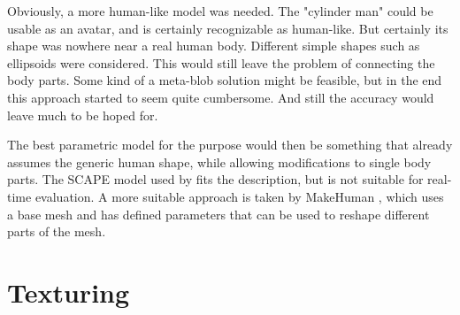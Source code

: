 Obviously, a more human-like model was needed. The "cylinder man" could be usable as an avatar, and is certainly recognizable as human-like. But certainly its shape was nowhere near a real human body. Different simple shapes such as ellipsoids were considered. This would still leave the problem of connecting the body parts. Some kind of a meta-blob solution might be feasible, but in the end this approach started to seem quite cumbersome. And still the accuracy would leave much to be hoped for.

The best parametric model for the purpose would then be something that already assumes the generic human shape, while allowing  modifications to single body parts. The SCAPE model \citep{} used by \citet{} fits the description, but is not suitable for real-time evaluation. A more suitable approach is taken by MakeHuman \citep{}, which uses a base mesh and has defined parameters that can be used to reshape different parts of the mesh.

\section{Texturing}

